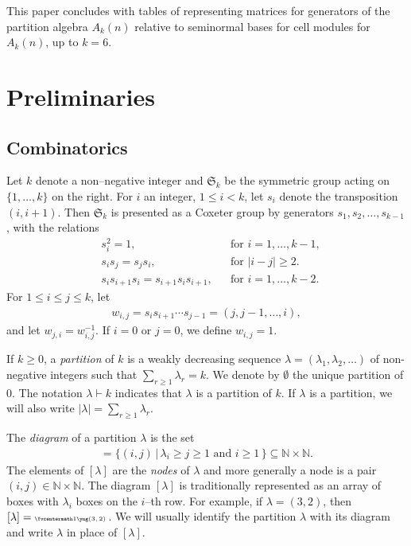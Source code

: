 \documentclass[11pt,a4paper,reqno,svgnames]{amsart}
\theoremstyle{plain}
\theoremstyle{definition}
\numberwithin{equation}{section}
\begin{document}
This paper concludes with tables of representing matrices for generators of the partition algebra $A_k(n)$ relative to seminormal bases for cell modules for $A_k(n)$, up to $k=6$. 

 

\section{Preliminaries}\label{p-r-s}
\subsection{Combinatorics}\label{c-t-s}
Let $k$ denote a non--negative integer and $\mathfrak{S}_k$ be the symmetric group acting on ${\lbrace}1,\dots,k{\rbrace}$ on the right. For $i$ an integer, $1{\leqslant} i<k$, let $s_i$ denote the transposition $(i,i+1)$. Then $\mathfrak{S}_k$ is presented as a Coxeter group by generators $s_1,s_2,\dots,s_{k-1}$, with the relations 
\begin{align*}
&s_i^2=1,&&\text{for $i=1,\ldots,k-1,$}\\
&s_is_j=s_js_i,&&\text{for $|i-j|{\geqslant} 2$.}\\
&s_is_{i+1}s_i=s_{i+1}s_is_{i+1},&&\text{for $i=1,\ldots,k-2$.}
\end{align*}
For $1{\leqslant} i{\leqslant} j{\leqslant} k$, let
\begin{align*}
w_{i,j}=s_is_{i+1}\cdots s_{j-1}=(j,j-1,\ldots,i),
\end{align*}
and let $w_{j,i}=w_{i,j}^{-1}$. If $i=0$ or $j=0$, we define $w_{i,j}=1$. 

If $k{\geqslant} 0$, a \emph{partition} of $k$ is a weakly decreasing sequence $\lambda=(\lambda_1,\lambda_2,\dots)$ of non-negative integers such that $\sum_{r{\geqslant} 1}\lambda_r=k$. We denote by $\emptyset$ the unique partition of $0$. The notation $\lambda\vdash k$ indicates that $\lambda$ is a partition of $k$. If $\lambda$ is a partition, we will also write $|\lambda|=\sum_{r{\geqslant} 1}\lambda_r$. 

The \emph{diagram} of a partition $\lambda$ is the set
\begin{align*}
[\lambda]={\lbrace}(i,j)\,|\,\text{$\lambda_i{\geqslant} j{\geqslant}1$ and $i{\geqslant}
1$}\,{\rbrace}\subseteq \mathbb{N}\times\mathbb{N}.
\end{align*}
The elements of $[\lambda]$ are the \emph{nodes} of $\lambda$ and more generally a node is a pair $(i,j)\in\mathbb{N}\times\mathbb{N}$. The diagram $[\lambda]$ is traditionally represented as an array of boxes with $\lambda_i$ boxes on the $i$--th row. For example, if $\lambda=(3,2)$, then $[\lambda]=\text{\tiny\Yvcentermath1$\yng(3,2)$}$\,. We will usually identify the partition $\lambda$ with its diagram and write $\lambda$ in place of $[\lambda]$.
\end{document}
